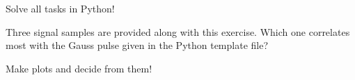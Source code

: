 \begin{question}[subtitle={Python Programming: Cross-correlation}]
Solve all tasks in Python!

Three signal samples are provided along with this exercise. Which one correlates most with the Gauss pulse given in the Python template file?

Make plots and decide from them!
\end{question}

\begin{solution}
\end{solution}



%
